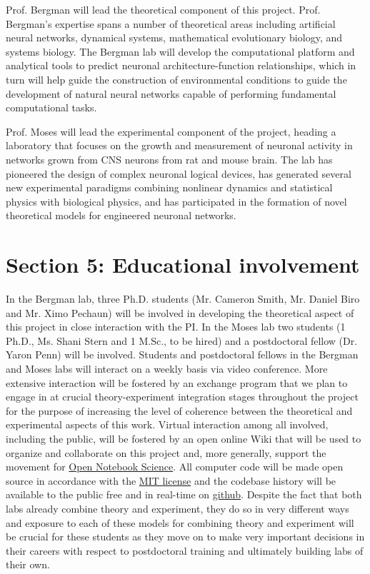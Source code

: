 Prof. Bergman will lead the theoretical component of this project. Prof. Bergman's expertise spans a number of theoretical areas including artificial neural networks, dynamical systems, mathematical evolutionary biology, and systems biology. The Bergman lab will develop the computational platform and analytical tools to predict neuronal architecture-function relationships, which in turn will help guide the construction of environmental conditions to guide the development of natural neural networks capable of performing fundamental computational tasks. 

Prof. Moses will lead the experimental component of the project, heading a laboratory that focuses on the growth and measurement of neuronal activity in networks grown from CNS neurons from rat and mouse brain. The lab has pioneered the design of complex neuronal logical devices, has generated several new experimental paradigms combining nonlinear dynamics and statistical physics with biological physics, and has participated in the formation of novel theoretical models for engineered neuronal networks.

\section{Section 5: Educational involvement}
In the Bergman lab, three Ph.D. students (Mr. Cameron Smith, Mr. Daniel Biro and Mr. Ximo Pechaun) will be involved in developing the theoretical aspect of this project in close interaction with the PI. In the Moses lab two students (1 Ph.D., Ms. Shani Stern and 1 M.Sc., to be hired) and a postdoctoral fellow (Dr. Yaron Penn) will be involved. Students and postdoctoral fellows in the Bergman and Moses labs will interact on a weekly basis via video conference. More extensive interaction will be fostered by an exchange program that we plan to engage in at crucial theory-experiment integration stages throughout the project for the purpose of increasing the level of coherence between the theoretical and experimental aspects of this work. Virtual interaction among all involved, including the public, will be fostered by an open online Wiki that will be used to organize and collaborate on this project and, more generally, support the movement for \href{http://en.wikipedia.org/wiki/Open\_notebook\_science}{Open Notebook Science}. All computer code will be made open source in accordance with the \href{http://opensource.org/licenses/MIT}{MIT license} and the codebase history will be available to the public free and in real-time on \href{http://www.github.com}{github}. Despite the fact that both labs already combine theory and experiment, they do so in very different ways and exposure to each of these models for combining theory and experiment will be crucial for these students as they move on to make very important decisions in their careers with respect to postdoctoral training and ultimately building labs of their own.
